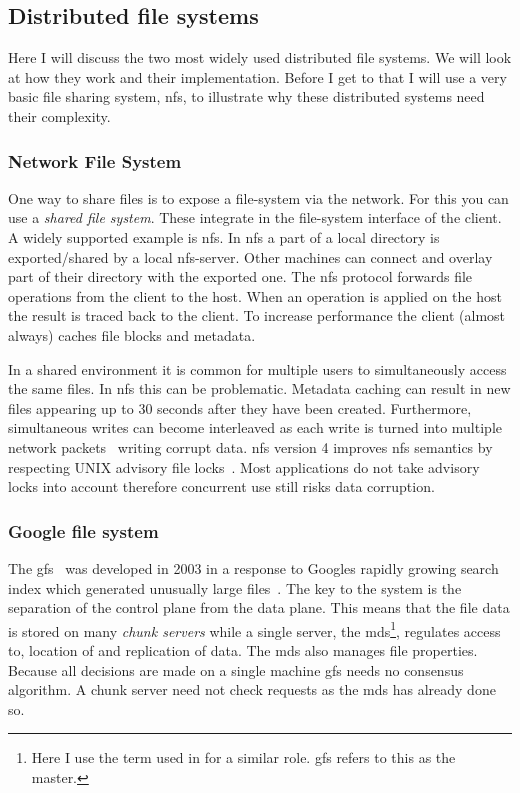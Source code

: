 \subsection{Distributed file systems}
Here I will discuss the two most widely used distributed file systems. We will look at how they work and their implementation. Before I get to that I will use a very basic file sharing system, \ac{nfs}, to illustrate why these distributed systems need their complexity.

\subsubsection*{Network File System}
One way to share files is to expose a file-system via the network. For this you can use a \textit{shared file system}. These integrate in the file-system interface of the client. A widely supported example is \acf{nfs}. In \ac{nfs} a part of a local directory is exported/shared by a local \ac{nfs}-server. Other machines can connect and overlay part of their directory with the exported one. The \ac{nfs} protocol forwards file operations from the client to the host. When an operation is applied on the host the result is traced back to the client. To increase performance the client (almost always) caches file blocks and metadata. 

In a shared environment it is common for multiple users to simultaneously access the same files. In \ac{nfs} this can be problematic. Metadata caching can result in new files appearing up to 30 seconds after they have been created. Furthermore, simultaneous writes can become interleaved as each write is turned into multiple network packets~\cite[p. 527]{os} writing corrupt data. \ac{nfs} version 4 improves \ac{nfs} semantics by respecting UNIX advisory file locks~\cite{rfc3530}. Most applications do not take advisory locks into account therefore concurrent use still risks data corruption. 

\subsubsection*{Google file system}
The \ac{gfs}~\cite{GFS} was developed in 2003 in a response to Googles rapidly growing search index which generated unusually large files~\cite{GFS_interview}. The key to the system is the separation of the control plane from the data plane. This means that the file data is stored on many \textit{chunk servers} while a single server, the \ac{mds}\footnote{Here I use the term used in \ceph{} for a similar role. \ac{gfs} refers to this as the master.}, regulates access to, location of and replication of data. The \ac{mds} also manages file properties. Because all decisions are made on a single machine \ac{gfs} needs no consensus algorithm. A chunk server need not check requests as the \ac{mds} has already done so. 

